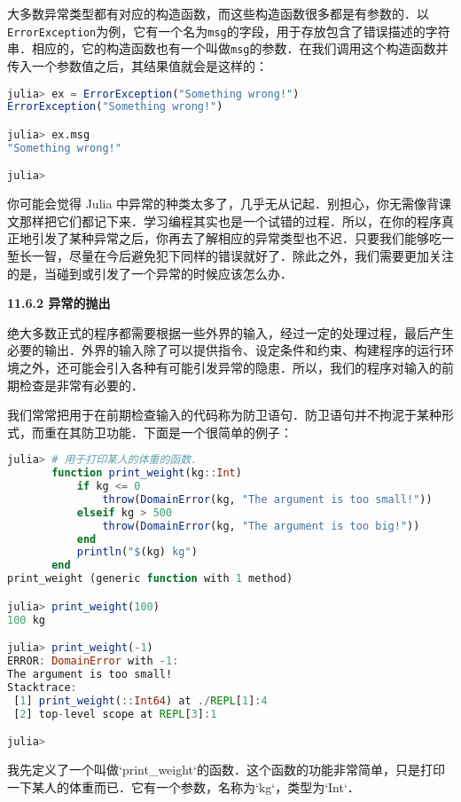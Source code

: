 大多数异常类型都有对应的构造函数，而这些构造函数很多都是有参数的．以\verb|ErrorException|为例，它有一个名为\verb|msg|的字段，用于存放包含了错误描述的字符串．相应的，它的构造函数也有一个叫做\verb|msg|的参数．在我们调用这个构造函数并传入一个参数值之后，其结果值就会是这样的：

\begin{lstlisting}[language=julia]
julia> ex = ErrorException("Something wrong!")
ErrorException("Something wrong!")

julia> ex.msg
"Something wrong!"

julia> 
\end{lstlisting}

你可能会觉得 Julia 中异常的种类太多了，几乎无从记起．别担心，你无需像背课文那样把它们都记下来．学习编程其实也是一个试错的过程．所以，在你的程序真正地引发了某种异常之后，你再去了解相应的异常类型也不迟．只要我们能够吃一堑长一智，尽量在今后避免犯下同样的错误就好了．除此之外，我们需要更加关注的是，当碰到或引发了一个异常的时候应该怎么办．

\textbf{11.6.2 异常的抛出}

绝大多数正式的程序都需要根据一些外界的输入，经过一定的处理过程，最后产生必要的输出．外界的输入除了可以提供指令、设定条件和约束、构建程序的运行环境之外，还可能会引入各种有可能引发异常的隐患．所以，我们的程序对输入的前期检查是非常有必要的．

我们常常把用于在前期检查输入的代码称为防卫语句．防卫语句并不拘泥于某种形式，而重在其防卫功能．下面是一个很简单的例子：

\begin{lstlisting}[language=julia]
julia> # 用于打印某人的体重的函数．
       function print_weight(kg::Int)
           if kg <= 0
               throw(DomainError(kg, "The argument is too small!"))
           elseif kg > 500 
               throw(DomainError(kg, "The argument is too big!"))
           end
           println("$(kg) kg")
       end
print_weight (generic function with 1 method)

julia> print_weight(100)
100 kg

julia> print_weight(-1)
ERROR: DomainError with -1:
The argument is too small!
Stacktrace:
 [1] print_weight(::Int64) at ./REPL[1]:4
 [2] top-level scope at REPL[3]:1

julia> 
\end{lstlisting}

我先定义了一个叫做`print_weight`的函数．这个函数的功能非常简单，只是打印一下某人的体重而已．它有一个参数，名称为`kg`，类型为`Int`．


